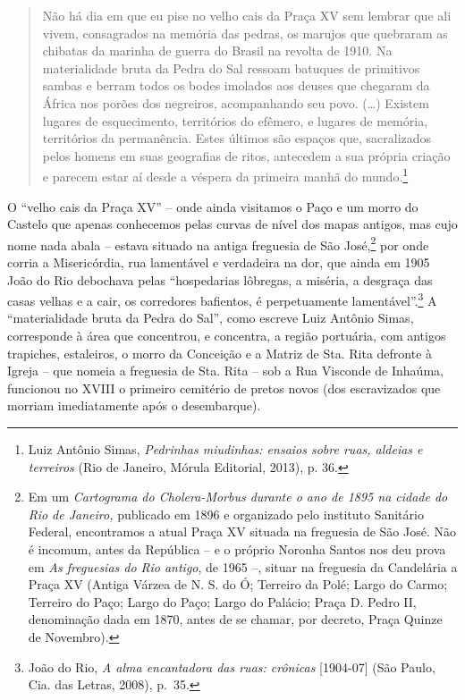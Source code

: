 \begin{quote}
Não há dia em que eu pise no velho cais da Praça XV sem lembrar que ali
vivem, consagrados na memória das pedras, os marujos que quebraram as
chibatas da marinha de guerra do Brasil na revolta de 1910. Na
materialidade bruta da Pedra do Sal ressoam batuques de primitivos
sambas e berram todos os bodes imolados aos deuses que chegaram da
África nos porões dos negreiros, acompanhando seu povo. (\ldots{})
Existem lugares de esquecimento, territórios do efêmero, e lugares de
memória, territórios da permanência. Estes últimos são espaços que,
sacralizados pelos homens em suas geografias de ritos, antecedem a sua
própria criação e parecem estar aí desde a véspera da primeira manhã do
mundo.\footnote{Luiz Antônio Simas, \emph{Pedrinhas miudinhas: ensaios
  sobre ruas, aldeias e terreiros} (Rio de Janeiro, Mórula Editorial,
  2013), p. 36.}
\end{quote}

O ``velho cais da Praça XV'' -- onde ainda visitamos o Paço e um morro
do Castelo que apenas conhecemos pelas curvas de nível dos mapas
antigos, mas cujo nome nada abala -- estava situado na antiga freguesia
de São José,\footnote{Em um \emph{Cartograma do Cholera-Morbus durante o
  ano de 1895 na cidade do Rio de Janeiro,} publicado em 1896 e
  organizado pelo instituto Sanitário Federal, encontramos a atual Praça
  XV situada na freguesia de São José. Não é incomum, antes da República
  -- e o próprio Noronha Santos nos deu prova em \emph{As freguesias do
  Rio antigo}, de 1965 --, situar na freguesia da Candelária a Praça XV
  (Antiga Várzea de N. S. do Ó; Terreiro da Polé; Largo do Carmo;
  Terreiro do Paço; Largo do Paço; Largo do Palácio; Praça D. Pedro II,
  denominação dada em 1870, antes de se chamar, por decreto, Praça
  Quinze de Novembro).} por onde corria a Misericórdia, rua lamentável e
verdadeira na dor, que ainda em 1905 João do Rio debochava pelas
``hospedarias lôbregas, a miséria, a desgraça das casas velhas e a cair,
os corredores bafientos, é perpetuamente lamentável''.\footnote{João do
  Rio, \emph{A alma encantadora das ruas: crônicas} {[}1904-07{]} (São
  Paulo, Cia. das Letras, 2008), p.~35.} A ``materialidade bruta da
Pedra do Sal'', como escreve Luiz Antônio Simas, corresponde à área que
concentrou, e concentra, a região portuária, com antigos trapiches,
estaleiros, o morro da Conceição e a Matriz de Sta. Rita defronte à
Igreja -- que nomeia a freguesia de Sta. Rita -- sob a Rua Visconde de
Inhaúma, funcionou no XVIII o primeiro cemitério de pretos novos (dos
escravizados que morriam imediatamente após o desembarque).

